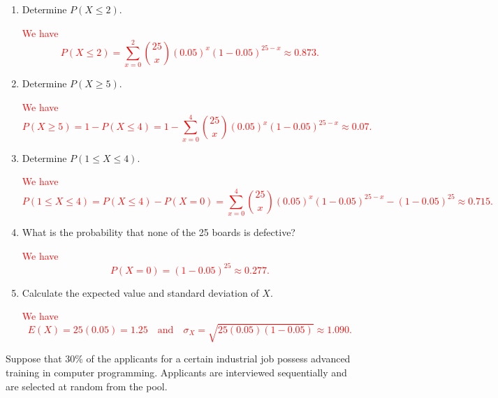 \documentclass[12pt,reqno]{amsart}
\begin{document}
\medskip
\begin{enumerate}
\item Determine $P(X\leq 2)$.

\bigskip
\textcolor{red}{We have
	\[P(X\leq 2) = \sum_{x=0}^2 \binom{25}{x} (0.05)^x (1-0.05)^{25-x} \approx 0.873.
	\]}
\bigskip

\item Determine $P(X\geq 5)$.

\bigskip
\textcolor{red}{We have
	\[P(X\geq 5) = 1 - P(X \leq 4) = 1 - \sum_{x=0}^4 \binom{25}{x} (0.05)^x (1-0.05)^{25-x} \approx 0.07.
	\]}
\bigskip

\item Determine $P(1\leq X \leq 4)$.

\bigskip
\textcolor{red}{We have
	\[P(1\leq X \leq 4) =  P(X \leq 4) - P(X = 0) = \sum_{x=0}^4 \binom{25}{x} (0.05)^x (1-0.05)^{25-x} - (1-0.05)^{25} \approx 0.715.
	\]}
\bigskip

\item What is the probability that none of the 25 boards is defective?

\bigskip
\textcolor{red}{We have
	\[P(X = 0) = (1-0.05)^{25} \approx 0.277.
	\]}
\bigskip

\item Calculate the expected value and standard deviation of $X$.

\bigskip
\textcolor{red}{We have
	\[E(X) = 25(0.05) = 1.25 \quad \text{and} \quad \sigma_X = \sqrt{25(0.05)(1-0.05)} \approx 1.090.
	\]}
\end{enumerate}













\prob Suppose that 30\% of the applicants for a certain industrial job possess advanced training in computer programming. Applicants are interviewed sequentially and are selected at random from the pool.
\end{document}
